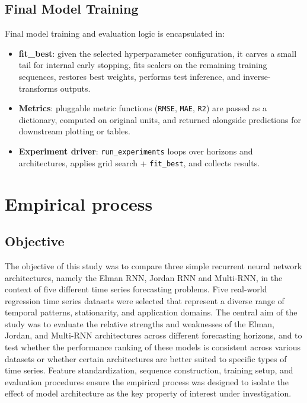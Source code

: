 \documentclass[conference]{IEEEtran}
\begin{document}
\subsection{\textbf{Final Model Training}}
Final model training and evaluation logic is encapsulated in:
\begin{itemize}
    \item \textbf{fit\_best}: given the selected hyperparameter configuration, it carves a small tail for internal early stopping, fits scalers on the remaining training sequences, restores best weights, performs test inference, and inverse-transforms outputs.
    \item \textbf{Metrics}: pluggable metric functions (\texttt{RMSE}, \texttt{MAE}, \texttt{R2}) are passed as a dictionary, computed on original units, and returned alongside predictions for downstream plotting or tables.
    \item \textbf{Experiment driver}: \texttt{run\_experiments} loops over horizons and architectures, applies grid search + \texttt{fit\_best}, and collects results.
\end{itemize}

\section{\textbf{Empirical process}}

\subsection{\textbf{Objective}}
The objective of this study was to compare three simple recurrent neural network architectures, namely the Elman RNN, Jordan RNN and Multi-RNN, in the context of five different time series forecasting problems. Five real-world regression time series datasets were selected that represent a diverse range of temporal patterns, stationarity, and application domains.
The central aim of the study was to evaluate the relative strengths and weaknesses of the Elman, Jordan, and Multi-RNN architectures across different forecasting horizons, and to test whether the performance ranking of these models is consistent across various datasets or whether certain architectures are better suited to specific types of time series.
Feature standardization, sequence construction, training setup, and evaluation procedures ensure the empirical process was designed to isolate the effect of model architecture as the key property of interest under investigation.
\end{document}
